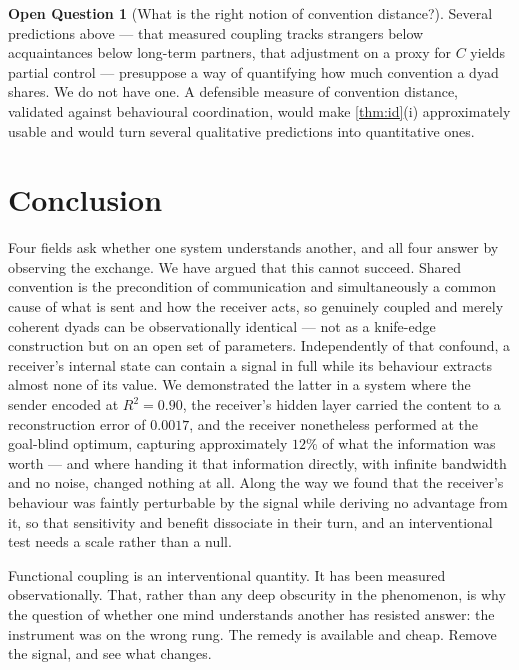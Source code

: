 \documentclass[11pt,a4paper]{article}
\theoremstyle{plain}
\theoremstyle{definition}
\newtheorem{question}{Open Question}
\theoremstyle{remark}
\begin{document}
\begin{question}[What is the right notion of convention distance?]\label{q:distance}
Several predictions above --- that measured coupling tracks strangers below acquaintances below long-term
partners, that adjustment on a proxy for $C$ yields partial control --- presuppose a way of quantifying how much
convention a dyad shares. We do not have one. A defensible measure of convention distance, validated against
behavioural coordination, would make \cref{thm:id}(i) approximately usable and would turn several qualitative
predictions into quantitative ones.
\end{question}

\section{Conclusion}\label{sec:conclusion}

Four fields ask whether one system understands another, and all four answer by observing the exchange. We have
argued that this cannot succeed. Shared convention is the precondition of communication and simultaneously a
common cause of what is sent and how the receiver acts, so genuinely coupled and merely coherent dyads can be
observationally identical --- not as a knife-edge construction but on an open set of parameters. Independently
of that confound, a receiver's internal state can contain a signal in full while its behaviour extracts almost
none of its value. We demonstrated the latter in a system where the sender encoded at $R^2 = 0.90$, the
receiver's hidden layer carried the content to a reconstruction error of $0.0017$, and the receiver nonetheless
performed at the goal-blind optimum, capturing approximately $12\%$ of what the information was worth --- and where
handing it that information directly, with infinite bandwidth and no noise, changed nothing at all. Along the
way we found that the receiver's behaviour was faintly perturbable by the signal while deriving no advantage
from it, so that sensitivity and benefit dissociate in their turn, and an interventional test needs a scale
rather than a null.

Functional coupling is an interventional quantity. It has been measured observationally. That, rather than any
deep obscurity in the phenomenon, is why the question of whether one mind understands another has resisted
answer: the instrument was on the wrong rung. The remedy is available and cheap. Remove the signal, and see what
changes.
\end{document}
